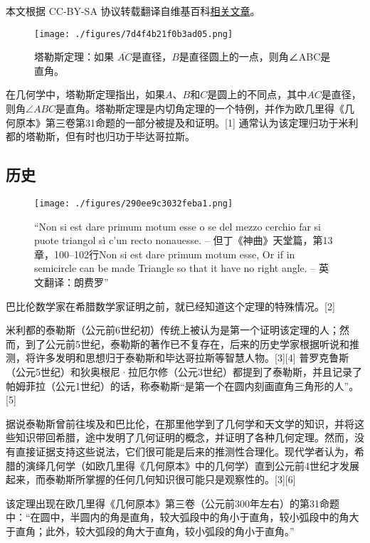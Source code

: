 
本文根据 CC-BY-SA 协议转载翻译自维基百科\href{https://en.wikipedia.org/wiki/Thales\%27s_theorem}{相关文章}。

\begin{figure}[ht]
\centering
\texttt{[image: ./figures/7d4f4b21f0b3ad05.png]}
\caption{塔勒斯定理：如果 \(\overline{AC}\)是直径，\(B\)是直径圆上的一点，则角∠ABC是直角。} \label{fig_Thales_1}
\end{figure}
在几何学中，塔勒斯定理指出，如果\(A\)、\(B\)和\(C\)是圆上的不同点，其中\(\overline{AC}\)是直径，则角\(\angle ABC\)是直角。塔勒斯定理是内切角定理的一个特例，并作为欧几里得《几何原本》第三卷第31命题的一部分被提及和证明。[1] 通常认为该定理归功于米利都的塔勒斯，但有时也归功于毕达哥拉斯。
\subsection{历史}
\begin{figure}[ht]
\centering
\texttt{[image: ./figures/290ee9c3032feba1.png]}
\caption{“Non si est dare primum motum esse o se del mezzo cerchio far si puote triangol sì c'un recto nonauesse. – 但丁《神曲》天堂篇，第13章，100–102行Non si est dare primum motum esse, Or if in semicircle can be made Triangle so that it have no right angle. – 英文翻译：朗费罗”} \label{fig_Thales_2}
\end{figure}
巴比伦数学家在希腊数学家证明之前，就已经知道这个定理的特殊情况。[2]

米利都的泰勒斯（公元前6世纪初）传统上被认为是第一个证明该定理的人；然而，到了公元前5世纪，泰勒斯的著作已不复存在，后来的历史学家根据听说和推测，将许多发明和思想归于泰勒斯和毕达哥拉斯等智慧人物。[3][4] 普罗克鲁斯（公元5世纪）和狄奥根尼·拉厄尔修（公元3世纪）都提到了泰勒斯，并且记录了帕姆菲拉（公元1世纪）的话，称泰勒斯“是第一个在圆内刻画直角三角形的人”。[5]

据说泰勒斯曾前往埃及和巴比伦，在那里他学到了几何学和天文学的知识，并将这些知识带回希腊，途中发明了几何证明的概念，并证明了各种几何定理。然而，没有直接证据支持这些说法，它们很可能是后来的推测性合理化。现代学者认为，希腊的演绎几何学（如欧几里得《几何原本》中的几何学）直到公元前4世纪才发展起来，而泰勒斯所掌握的任何几何知识很可能只是观察性的。[3][6]

该定理出现在欧几里得《几何原本》第三卷（公元前300年左右）的第31命题中：“在圆中，半圆内的角是直角，较大弧段中的角小于直角，较小弧段中的角大于直角；此外，较大弧段的角大于直角，较小弧段的角小于直角。”

